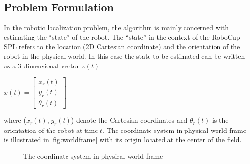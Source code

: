 \subsection{Problem Formulation}\label{sub:problem}
In the robotic localization problem, the algorithm is mainly concerned with estimating the ``state'' of the robot. The ``state'' in the context of the RoboCup \gls{SPL} refers to the location (2D Cartesian coordinate) and the orientation of the robot in the physical world. In this case the state to be estimated can be written as a 3 dimensional vector $x(t)$
\begin{center}
$x(t) =
 \begin{bmatrix}
  x_{r}(t) \\
  y_{r}(t) \\
  \theta_{r}(t) 
 \end{bmatrix} $ \\
\end{center}
where ($x_{r}(t)$, $y_{r}(t)$) denote the Cartesian coordinates and $\theta_{r}(t)$ is the orientation of the robot at time $t$. The coordinate system in physical world frame is illustrated in \autoref{fig:worldframe} with its origin located at the center of the field.
\begin{figure}[h]
  \centering
  \caption{The coordinate system in physical world frame}
  \label{fig:worldframe}
\end{figure}

